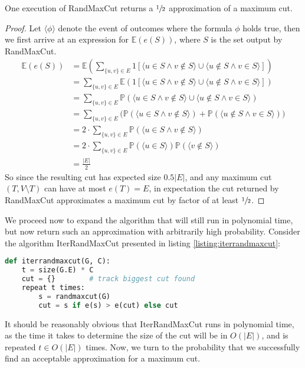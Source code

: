 		\begin{claim}
			One execution of RandMaxCut returns a $\sfrac{1}{2}$ approximation of a maximum cut.
		\end{claim}
		\begin{proof}
			Let $\langle \phi \rangle$ denote the event of outcomes where the formula $\phi$ holds true, then we first arrive at 
			an expression for $\mathbb{E}(e(S))$, where $S$ is the set output by RandMaxCut.
			\begin{align*}
				\mathbb{E}(e(S)) &= \mathbb{E}\left(\sum_{\{u,v\} \in E} 1[\langle u \in S \land v \notin S\rangle \cup \langle 
				                 u \notin S \land v \in S \rangle]\right) \\
				                 &= \sum_{\{u,v\} \in E} \mathbb{E}(1[\langle u \in S \land v \notin S\rangle \cup \langle u 
						 \notin S \land v \in S \rangle]) \\
				                 &= \sum_{\{u,v\} \in E} \mathbb{P}(\langle u \in S \land v \notin S\rangle \cup \langle u 
						 \notin S \land v \in S \rangle) \\
				                 &= \sum_{\{u,v\} \in E} \big(\mathbb{P}(\langle u \in S \land v \notin S\rangle)  + 
						 \mathbb{P}(\langle u \notin S \land v \in S \rangle)\big) \\
				                 &= 2 \cdot \sum_{\{u,v\} \in E} \mathbb{P}(\langle u \in S \land v \notin S\rangle) \\
				                 &= 2 \cdot \sum_{\{u,v\} \in E} \mathbb{P}(\langle u \in S\rangle) 
						 \mathbb{P}(\langle v \notin S\rangle) \\
				                 &= \frac{|E|}{2}
			\end{align*}
			So since the resulting cut has expected size $0.5 |E|$, and any maximum cut $(T, V\setminus T)$ can have at most
			$e(T) = E$, in expectation the cut returned by RandMaxCut approximates a maximum cut by factor of at least 
			$\sfrac{1}{2}$.
		\end{proof}

		We proceed now to expand the algorithm that will still run in polynomial time, but now return such an approximation with 
		arbitrarily high probability. Consider the algorithm IterRandMaxCut presented in listing \ref{listing:iterrandmaxcut}:
		\begin{lstlisting}[caption={Algorithm IterRandMaxCut},label=listing:iterrandmaxcut,style=mystyle,language=python]
def iterrandmaxcut(G, C):
	t = size(G.E) * C
	cut = {}		# track biggest cut found
	repeat t times:
		s = randmaxcut(G)
		cut = s if e(s) > e(cut) else cut
		\end{lstlisting}
		It should be reasonably obvious that IterRandMaxCut runs in polynomial time, as the time it takes to determine the size of
		the cut will be in $O(|E|)$, and is repeated $t \in O(|E|)$ times. Now, we turn to the probability that we successfully 
		find an acceptable approximation for a maximum cut. 
		
